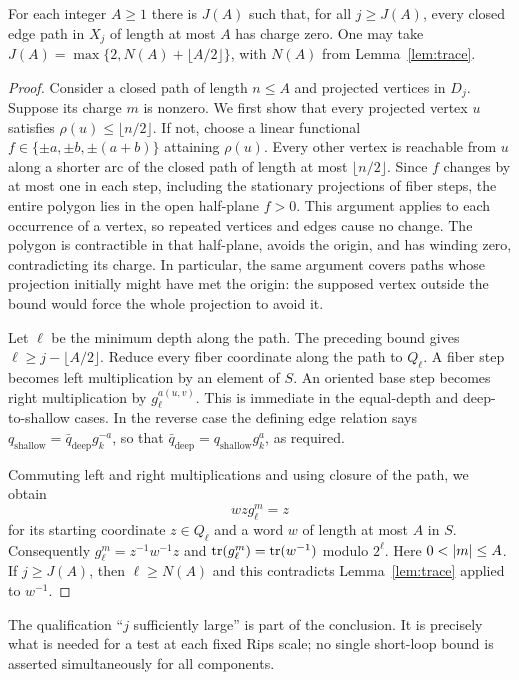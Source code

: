 \begin{lemma}\label{lem:smallloops}
For each integer $A\ge1$ there is $J(A)$ such that, for all $j\ge J(A)$,
every closed edge path in $X_j$ of length at most $A$ has charge zero.
One may take $J(A)=\max\{2,N(A)+\lfloor A/2\rfloor\}$, with $N(A)$ from
Lemma~\ref{lem:trace}.
\end{lemma}
\begin{proof}
Consider a closed path of length $n\le A$ and projected vertices in $D_j$.
Suppose its charge $m$ is nonzero. We first show that every projected vertex
$u$ satisfies $\rho(u)\le\lfloor n/2\rfloor$.
If not, choose a linear functional
$f\in\{\pm a,\pm b,\pm(a+b)\}$ attaining $\rho(u)$.
Every other vertex is reachable from $u$ along a shorter arc of the closed
path of length at most $\lfloor n/2\rfloor$. Since $f$ changes by at most
one in each step, including the stationary projections of fiber steps,
the entire polygon lies in the open half-plane $f>0$. This argument applies
to each occurrence of a vertex, so repeated vertices and edges cause no
change. The polygon is contractible in that half-plane, avoids the origin,
and has winding zero, contradicting its charge. In particular, the same
argument covers paths whose projection initially might have met the origin:
the supposed vertex outside the bound would force the whole projection to
avoid it.

Let $\ell$ be the minimum depth along the path. The preceding bound gives
$\ell\ge j-\lfloor A/2\rfloor$. Reduce every fiber coordinate along the
path to $Q_\ell$. A fiber step becomes left multiplication by an element of
$S$. An oriented base step becomes right multiplication by
$g_\ell^{a(u,v)}$. This is immediate in the equal-depth and deep-to-shallow
cases. In the reverse case the defining edge relation says
$q_{\mathrm{shallow}}=\bar q_{\mathrm{deep}}g_k^{-a}$, so that
$\bar q_{\mathrm{deep}}=q_{\mathrm{shallow}}g_k^a$, as required.

Commuting left and right multiplications and using closure of the path,
we obtain
\[
 w z g_\ell^m=z
\]
for its starting coordinate $z\in Q_\ell$ and a word $w$ of length at most
$A$ in $S$. Consequently $g_\ell^m=z^{-1}w^{-1}z$ and
$\operatorname{tr}(g_\ell^m)=\operatorname{tr}(w^{-1})$ modulo $2^\ell$.
Here $0<\lvert m\rvert\le A$. If $j\ge J(A)$, then $\ell\ge N(A)$ and this
contradicts Lemma~\ref{lem:trace} applied to $w^{-1}$.
\end{proof}

The qualification ``$j$ sufficiently large'' is part of the conclusion.
It is precisely what is needed for a test at each fixed Rips scale; no
single short-loop bound is asserted simultaneously for all components.
